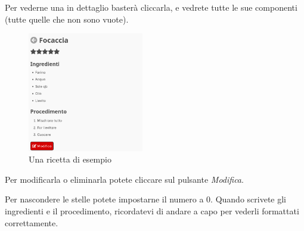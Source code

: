 \documentclass[12pt, a4paper]{report}
\begin{document}
    Per vederne una in dettaglio basterà cliccarla, e vedrete tutte le sue componenti (tutte quelle che non sono vuote).

    \begin{figure}[H]
        \centering
        \includegraphics[width=0.45\textwidth]{assets/it/recipe.png}
        \caption{Una ricetta di esempio}
    \end{figure}

    Per modificarla o eliminarla potete cliccare sul pulsante \emph{Modifica}.

    Per nascondere le stelle potete impostarne il numero a 0. Quando scrivete gli ingredienti e il procedimento, ricordatevi di andare a capo per
    vederli formattati correttamente.
\end{document}
